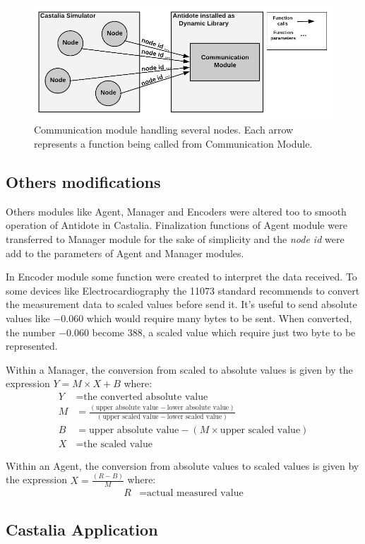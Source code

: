 \begin{figure}[htbp]
\centerline{\includegraphics[scale=0.31]{figures/communicationModule.png}}
\caption{Communication module handling several nodes. Each arrow represents a function being called from Communication Module.}
\label{fig:communicationModuleCastalia}
\end{figure}

\subsection{Others modifications}

Others modules like Agent, Manager and Encoders were altered too to smooth operation of Antidote in Castalia. Finalization functions of Agent module were transferred to Manager module for the sake of simplicity and the \textit{node id} were add to the parameters of Agent and Manager modules.

In Encoder module some function were created to interpret the data received. To some devices like Electrocardiography the 11073 standard recommends to convert the measurement data to scaled values before send it. It's useful to send absolute values like $-0.060$  which would require many bytes to be sent. When converted, the number $-0.060$ become $388$, a scaled value which require just two byte to be represented.

Within a Manager, the conversion from scaled to absolute values is given by the expression $Y = M \times X + B$ where:
\begin{align*}
    Y &= \text{the converted absolute value}\\
    M &= \frac{(\text{upper absolute value} - \text{lower absolute value})}{(\text{upper scaled value} - \text{lower scaled value})}\\
    B &= \text{upper absolute value} - (M \times \text{upper scaled value})\\
    X &= \text{the scaled value}
\end{align*}

Within an Agent, the conversion from absolute values to scaled values is given by the expression $X = \frac{(R - B)}{M}$ where:
\begin{align*}
    R &= \text{actual measured value}
\end{align*}

\subsection{Castalia Application}